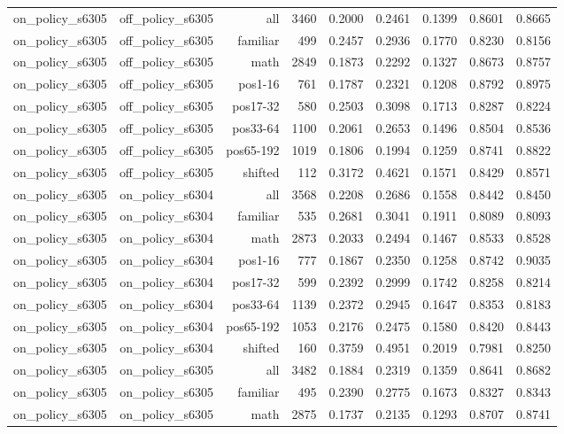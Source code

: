 \begin{tabular}{lrrrrrrrr}
on\_policy\_s6305 & off\_policy\_s6305 & all & 3460 & 0.2000 & 0.2461 & 0.1399 & 0.8601 & 0.8665 \\
on\_policy\_s6305 & off\_policy\_s6305 & familiar & 499 & 0.2457 & 0.2936 & 0.1770 & 0.8230 & 0.8156 \\
on\_policy\_s6305 & off\_policy\_s6305 & math & 2849 & 0.1873 & 0.2292 & 0.1327 & 0.8673 & 0.8757 \\
on\_policy\_s6305 & off\_policy\_s6305 & pos1-16 & 761 & 0.1787 & 0.2321 & 0.1208 & 0.8792 & 0.8975 \\
on\_policy\_s6305 & off\_policy\_s6305 & pos17-32 & 580 & 0.2503 & 0.3098 & 0.1713 & 0.8287 & 0.8224 \\
on\_policy\_s6305 & off\_policy\_s6305 & pos33-64 & 1100 & 0.2061 & 0.2653 & 0.1496 & 0.8504 & 0.8536 \\
on\_policy\_s6305 & off\_policy\_s6305 & pos65-192 & 1019 & 0.1806 & 0.1994 & 0.1259 & 0.8741 & 0.8822 \\
on\_policy\_s6305 & off\_policy\_s6305 & shifted & 112 & 0.3172 & 0.4621 & 0.1571 & 0.8429 & 0.8571 \\
on\_policy\_s6305 & on\_policy\_s6304 & all & 3568 & 0.2208 & 0.2686 & 0.1558 & 0.8442 & 0.8450 \\
on\_policy\_s6305 & on\_policy\_s6304 & familiar & 535 & 0.2681 & 0.3041 & 0.1911 & 0.8089 & 0.8093 \\
on\_policy\_s6305 & on\_policy\_s6304 & math & 2873 & 0.2033 & 0.2494 & 0.1467 & 0.8533 & 0.8528 \\
on\_policy\_s6305 & on\_policy\_s6304 & pos1-16 & 777 & 0.1867 & 0.2350 & 0.1258 & 0.8742 & 0.9035 \\
on\_policy\_s6305 & on\_policy\_s6304 & pos17-32 & 599 & 0.2392 & 0.2999 & 0.1742 & 0.8258 & 0.8214 \\
on\_policy\_s6305 & on\_policy\_s6304 & pos33-64 & 1139 & 0.2372 & 0.2945 & 0.1647 & 0.8353 & 0.8183 \\
on\_policy\_s6305 & on\_policy\_s6304 & pos65-192 & 1053 & 0.2176 & 0.2475 & 0.1580 & 0.8420 & 0.8443 \\
on\_policy\_s6305 & on\_policy\_s6304 & shifted & 160 & 0.3759 & 0.4951 & 0.2019 & 0.7981 & 0.8250 \\
on\_policy\_s6305 & on\_policy\_s6305 & all & 3482 & 0.1884 & 0.2319 & 0.1359 & 0.8641 & 0.8682 \\
on\_policy\_s6305 & on\_policy\_s6305 & familiar & 495 & 0.2390 & 0.2775 & 0.1673 & 0.8327 & 0.8343 \\
on\_policy\_s6305 & on\_policy\_s6305 & math & 2875 & 0.1737 & 0.2135 & 0.1293 & 0.8707 & 0.8741 \\

\end{tabular}
